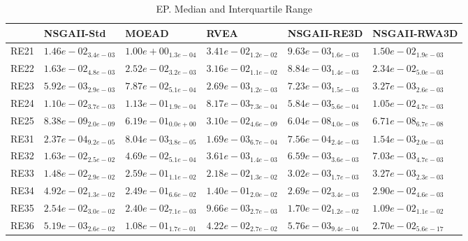 \documentclass{article}
\begin{document}
\begin{table}
\caption{EP. Median and Interquartile Range}
\label{table: EP}
\centering
\begin{scriptsize}
\begin{tabular}{llllll}
\hline & NSGAII-Std & MOEAD & RVEA & NSGAII-RE3D &  NSGAII-RWA3D\\
\hline 
RE21 & \cellcolor{gray25}$  1.46e-02_{ 3.4e-03}$ & $  1.00e+00_{ 1.3e-04}$ & $  3.41e-02_{ 1.2e-02}$ & \cellcolor{gray95}$  9.63e-03_{ 1.6e-03}$ & $  1.50e-02_{ 1.9e-03}$ \\
RE22 & \cellcolor{gray25}$  1.63e-02_{ 4.8e-03}$ & $  2.52e-02_{ 3.2e-03}$ & $  3.16e-02_{ 1.1e-02}$ & \cellcolor{gray95}$  8.84e-03_{ 1.4e-03}$ & $  2.34e-02_{ 5.0e-03}$ \\
RE23 & $  5.92e-03_{ 2.9e-03}$ & $  7.87e-02_{ 5.1e-04}$ & \cellcolor{gray95}$  2.69e-03_{ 1.2e-03}$ & $  7.23e-03_{ 1.5e-03}$ & \cellcolor{gray25}$  3.27e-03_{ 2.6e-03}$ \\
RE24 & $  1.10e-02_{ 3.7e-03}$ & $  1.13e-01_{ 1.9e-04}$ & \cellcolor{gray25}$  8.17e-03_{ 7.3e-04}$ & \cellcolor{gray95}$  5.84e-03_{ 5.6e-04}$ & $  1.05e-02_{ 4.7e-03}$ \\
RE25 & \cellcolor{gray95}$  8.38e-09_{ 2.0e-09}$ & $  6.19e-01_{ 0.0e+00}$ & $  3.10e-02_{ 4.6e-09}$ & \cellcolor{gray25}$  6.04e-08_{ 4.0e-08}$ & $  6.71e-08_{ 6.7e-08}$ \\
RE31 & \cellcolor{gray95}$  2.37e-04_{ 9.2e-05}$ & $  8.04e-03_{ 3.8e-05}$ & $  1.69e-03_{ 6.7e-04}$ & \cellcolor{gray25}$  7.56e-04_{ 2.4e-03}$ & $  1.54e-03_{ 2.0e-03}$ \\
RE32 & $  1.63e-02_{ 2.5e-02}$ & $  4.69e-02_{ 5.1e-04}$ & \cellcolor{gray95}$  3.61e-03_{ 1.4e-03}$ & \cellcolor{gray25}$  6.59e-03_{ 3.6e-03}$ & $  7.03e-03_{ 4.7e-03}$ \\
RE33 & $  1.48e-02_{ 2.9e-02}$ & $  2.59e-01_{ 1.1e-02}$ & $  2.18e-02_{ 1.3e-02}$ & \cellcolor{gray95}$  3.02e-03_{ 1.7e-03}$ & \cellcolor{gray25}$  3.27e-03_{ 2.3e-03}$ \\
RE34 & $  4.92e-02_{ 1.3e-02}$ & $  2.49e-01_{ 6.6e-02}$ & $  1.40e-01_{ 2.0e-02}$ & \cellcolor{gray95}$  2.69e-02_{ 3.4e-03}$ & \cellcolor{gray25}$  2.90e-02_{ 4.6e-03}$ \\
RE35 & $  2.54e-02_{ 3.0e-02}$ & $  2.40e-02_{ 7.1e-03}$ & \cellcolor{gray95}$  9.66e-03_{ 2.7e-03}$ & $  1.70e-02_{ 1.2e-02}$ & \cellcolor{gray25}$  1.09e-02_{ 1.1e-02}$ \\
RE36 & \cellcolor{gray95}$  5.19e-03_{ 2.6e-02}$ & $  1.08e-01_{ 1.7e-01}$ & $  4.22e-02_{ 2.7e-02}$ & \cellcolor{gray25}$  5.76e-03_{ 9.4e-04}$ & $  2.70e-02_{ 5.6e-17}$ \\

\end{tabular}
\end{scriptsize}
\end{table}
\end{document}

